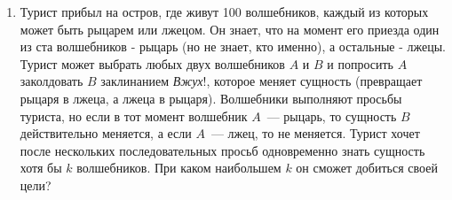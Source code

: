 \documentclass{article}
\begin{document}
\begin{enumerate}[label*=\textbf{\arabic{enumi}.}]
        \item Турист прибыл на остров, где живут 100 волшебников, каждый из которых может быть рыцарем или лжецом.
        Он знает, что на момент его приезда один из ста волшебников - рыцарь (но не знает, кто именно), а остальные - лжецы.
        Турист может выбрать любых двух волшебников $A$ и $B$ и попросить $A$ заколдовать $B$ заклинанием \textit{Вжух}!, которое меняет сущность (превращает рыцаря в лжеца, а лжеца в рыцаря).
        Волшебники выполняют просьбы туриста, но если в тот момент волшебник $A$~--- рыцарь, то сущность $B$ действительно меняется, а если $A$~--- лжец, то не меняется.
        Турист хочет после нескольких последовательных просьб одновременно знать сущность хотя бы $k$ волшебников.
        При каком наибольшем $k$ он сможет добиться своей цели?

    \end{enumerate}
\end{document}
